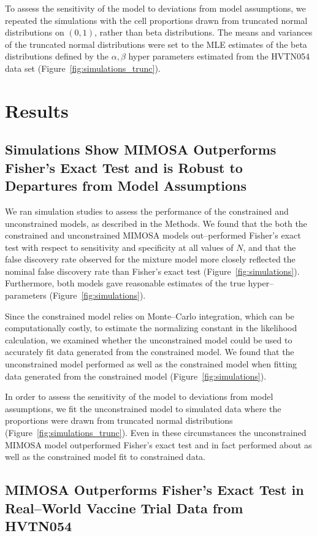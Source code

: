 \documentclass[11pt]{article}
\begin{document}
To assess the sensitivity of the model to deviations from model assumptions, we repeated the simulations with the cell proportions drawn from  truncated normal distributions on $(0,1)$, rather than beta distributions. The means and variances of the truncated normal distributions were set to the MLE estimates of the beta distributions defined by the $\alpha,\beta$ hyper parameters estimated from the HVTN054 data set (Figure~\ref{fig:simulations_trunc}). 

\section*{Results}
\subsection*{Simulations Show MIMOSA Outperforms Fisher's Exact Test and is Robust to Departures from Model Assumptions}
We ran simulation studies to assess the performance of the constrained and unconstrained models, as described in the Methods. We found that the both the constrained and unconstrained MIMOSA models out--performed Fisher's exact test with respect to sensitivity and specificity at all values of $N$, and that the false discovery rate observed for the mixture model more closely reflected the nominal false discovery rate than Fisher's exact test (Figure~\ref{fig:simulations}). Furthermore, both models gave reasonable estimates of the true hyper--parameters (Figure~\ref{fig:simulations}).

Since the constrained model relies on Monte--Carlo integration, which can be computationally costly, to estimate the normalizing constant in the likelihood calculation, we examined whether the unconstrained model could be used to accurately fit data generated from the constrained model. We found that the unconstrained model performed as well as the constrained model when fitting data generated from the constrained model (Figure~\ref{fig:simulations}).

In order to assess the sensitivity of the model to deviations from model assumptions, we fit the unconstrained model to simulated data where the proportions were drawn from truncated normal distributions (Figure~\ref{fig:simulations_trunc}). Even in these circumstances the unconstrained MIMOSA model outperformed Fisher's exact test and in fact performed about as well as the constrained model fit to constrained data.


\subsection*{MIMOSA Outperforms Fisher's Exact Test in Real--World Vaccine Trial Data from HVTN054}
\end{document}
